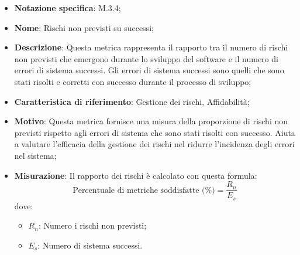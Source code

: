 \begin{itemize}
    \item \textbf{Notazione specifica}: M.3.4;
    \item \textbf{Nome}: Rischi non previsti su successi;
    \item \textbf{Descrizione}: Questa metrica rappresenta il rapporto tra il numero di rischi non previsti che emergono durante lo sviluppo del software e il numero di errori di sistema successi. Gli errori di sistema successi sono quelli che sono stati risolti e corretti con successo durante il processo di sviluppo;
    \item \textbf{Caratteristica di riferimento}: Gestione dei rischi, Affidabilità;
    \item \textbf{Motivo}: Questa metrica fornisce una misura della proporzione di rischi non previsti rispetto agli errori di sistema che sono stati risolti con successo. Aiuta a valutare l'efficacia della gestione dei rischi nel ridurre l'incidenza degli errori nel sistema;
    \item \textbf{Misurazione}: Il rapporto dei rischi è calcolato con questa formula:
    \[
        \text{Percentuale di metriche soddisfatte (\%)} =\frac{R_{n}}{E_{s}}
    \]
    dove:
    \begin{itemize}
        \item $R_{n}$: Numero i rischi non previsti;
        \item $E_{s}$: Numero di sistema successi.
    \end{itemize}
\end{itemize}
